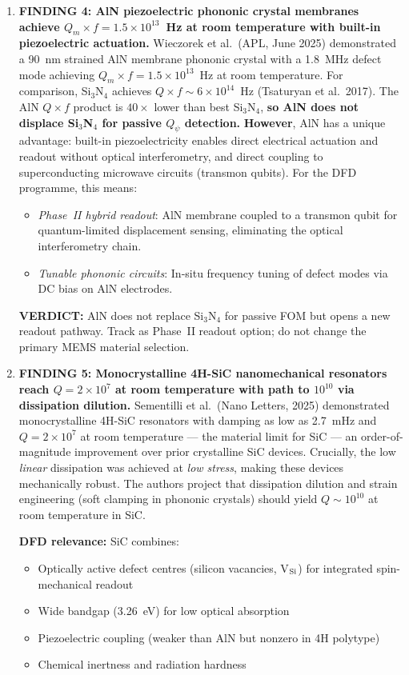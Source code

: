 \documentclass[11pt]{article}
\theoremstyle{definition}
\theoremstyle{remark}
\newcommand{\ee}[1]{\times 10^{#1}}
\newcommand{\Qpsi}{Q_\psi}
\newcommand{\verdict}[1]{\textcolor{green!50!black}{\textbf{VERDICT:} #1}}
\begin{document}
\begin{tcolorbox}[colback=blue!5!white, colframe=blue!50!black,
  title=\textbf{W4i13 TOP 5 FINDINGS --- Ranked by Programme Impact}]
\begin{enumerate}
\item \textbf{FINDING 4: AlN piezoelectric phononic crystal membranes
achieve $Q_m \times f = 1.5\ee{13}$~Hz at room temperature with
built-in piezoelectric actuation.}
Wieczorek et al.\ (APL, June 2025) demonstrated a 90~nm strained
AlN membrane phononic crystal with a 1.8~MHz defect mode achieving
$Q_m \times f = 1.5\ee{13}$~Hz at room temperature. For comparison,
Si$_3$N$_4$ achieves $Q \times f \sim 6\ee{14}$~Hz (Tsaturyan et al.\
2017). The AlN $Q \times f$ product is $40\times$ lower than best
Si$_3$N$_4$, \textbf{so AlN does not displace Si$_3$N$_4$ for
passive $\Qpsi$ detection.}
\textbf{However}, AlN has a unique advantage: built-in piezoelectricity
enables direct electrical actuation and readout without optical
interferometry, and direct coupling to superconducting microwave
circuits (transmon qubits). For the DFD programme, this means:
\begin{itemize}[nosep]
\item \textit{Phase~II hybrid readout}: AlN membrane coupled to
  a transmon qubit for quantum-limited displacement sensing,
  eliminating the optical interferometry chain.
\item \textit{Tunable phononic circuits}: In-situ frequency tuning
  of defect modes via DC bias on AlN electrodes.
\end{itemize}
\verdict{AlN does not replace Si$_3$N$_4$ for passive FOM but
opens a new readout pathway. Track as Phase~II readout option;
do not change the primary MEMS material selection.}

\item \textbf{FINDING 5: Monocrystalline 4H-SiC nanomechanical resonators
reach $Q = 2\ee{7}$ at room temperature with path to $10^{10}$ via
dissipation dilution.}
Sementilli et al.\ (Nano Letters, 2025) demonstrated monocrystalline
4H-SiC resonators with damping as low as 2.7~mHz and $Q = 2\ee{7}$
at room temperature --- the material limit for SiC --- an
order-of-magnitude improvement over prior crystalline SiC devices.
Crucially, the low \textit{linear} dissipation was achieved at
\textit{low stress}, making these devices mechanically robust.
The authors project that dissipation dilution and strain engineering
(soft clamping in phononic crystals) should yield $Q \sim 10^{10}$
at room temperature in SiC.

\textbf{DFD relevance:} SiC combines:
\begin{itemize}[nosep]
\item Optically active defect centres (silicon vacancies, V$_{\rm Si}$)
  for integrated spin-mechanical readout
\item Wide bandgap (3.26~eV) for low optical absorption
\item Piezoelectric coupling (weaker than AlN but nonzero in 4H polytype)
\item Chemical inertness and radiation hardness
\end{itemize}


\end{enumerate}
\end{tcolorbox}
\end{document}
